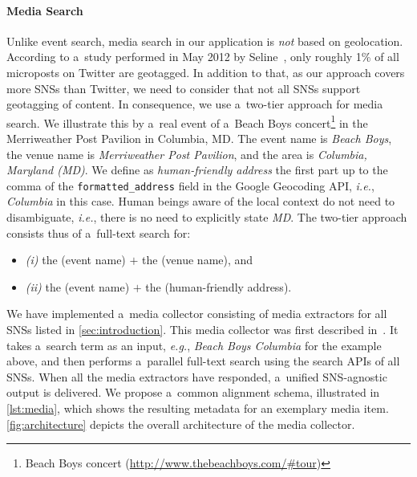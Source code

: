 \documentclass[runningheads,a4paper]{llncs}
\begin{document}
{\paragraph{Media Search} \label{sec:media-search}
Unlike event search, media search in our application is \emph{not} based on geolocation. According to a~study performed in May 2012 by Seline~\cite{Quora2012},
only roughly 1\% of all microposts on Twitter are geotagged. In addition to that, as our approach covers more SNSs than Twitter, we need to consider that not all SNSs support geotagging of content. In consequence, we use a~two-tier approach for media search. We illustrate this by a~real event of a~Beach Boys concert\footnote{Beach Boys concert (\url{http://www.thebeachboys.com/\#tour})} in the Merriweather Post Pavilion in Columbia, MD. The event name is \emph{Beach Boys},
the venue name is \emph{Merriweather Post Pavilion}, and the area is \emph{Columbia, Maryland (MD)}. We define as \emph{human-friendly address} the first part up to the comma of the \texttt{formatted\_address} field in the Google Geocoding API, \emph{i.e.}, \emph{Columbia} in this case. Human beings aware of the local context do not need to disambiguate, \emph{i.e.}, there is no need to explicitly state \emph{MD}. The two-tier approach consists thus of a~full-text search for:
\begin{itemize}
 \item \emph{(i)} the (event name) $+$ the (venue name), and
 \item \emph{(ii)} the (event name) $+$ the (human-friendly address).
\end{itemize}

We have implemented a~media collector consisting of media extractors for all SNSs listed in \autoref{sec:introduction}.
This media collector was first described in~\cite{Khrouf2012}.
It takes a~search term as an input, \emph{e.g.}, \emph{Beach Boys Columbia} for the example above, and then performs a~parallel full-text search using the search APIs of all SNSs. When all the media extractors have responded, a~unified SNS-agnostic output is delivered. We propose a~common alignment schema, illustrated in
\autoref{lst:media}, which shows the resulting metadata for an exemplary media item.  \autoref{fig:architecture} depicts the overall architecture of the media collector.

}
\end{document}
